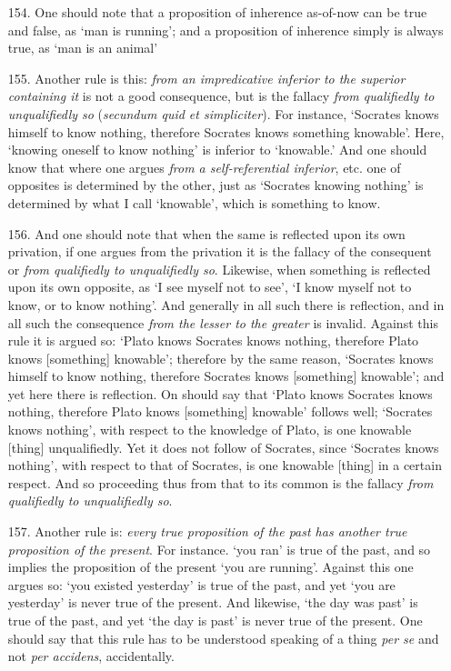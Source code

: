 \documentclass[]{article}
\begin{document}
\begin{itemize}
\item[154.] One should note that a proposition of inherence as-of-now can be true and false, as `man is running'; and a proposition of inherence simply is always true, as `man is an animal'
\item[155.] Another rule is this: \textit{from an impredicative inferior to the superior containing it} is not a good consequence, but is the fallacy \textit{from qualifiedly to unqualifiedly so} (\textit{secundum quid et simpliciter}). For instance, `Socrates knows himself to know nothing, therefore Socrates knows something knowable'. Here, `knowing oneself to know nothing' is inferior to `knowable.' And one should know that where one argues \textit{from a self-referential inferior}, etc. one of opposites is determined by the other, just as `Socrates knowing nothing' is determined by what I call `knowable', which is something to know.
\item[156.] And one should note that when the same is reflected upon its own privation, if one argues from the privation it is the fallacy of the consequent or \textit{from qualifiedly to unqualifiedly so}. Likewise, when something is reflected upon its own opposite, as `I see myself not to see', `I know myself not to know, or to know nothing'. And generally in all such there is reflection, and in all such the consequence \textit{from the lesser to the greater} is invalid. Against this rule it is argued so: `Plato knows Socrates knows nothing, therefore Plato knows [something] knowable'; therefore by the same reason, `Socrates  knows himself to know nothing, therefore Socrates knows [something] knowable'; and yet here there is reflection. On should say that `Plato knows Socrates knows nothing, therefore Plato knows [something] knowable' follows well; `Socrates knows nothing', with respect to the knowledge of Plato, is one knowable [thing] unqualifiedly. Yet it does not follow of Socrates, since `Socrates knows nothing', with respect to that of Socrates, is one knowable [thing] in a certain respect. And so proceeding thus from that to its common is the fallacy \textit{from qualifiedly to unqualifiedly so}. 
\item[157.] Another rule is: \textit{every true proposition of the past has another true proposition of the present}. For instance. `you ran' is true of the past, and so implies the proposition of the present `you are running'. Against this one argues so: `you existed yesterday' is true of the past, and yet `you are yesterday' is never true of the present. And likewise, `the day was past' is true of the past, and yet `the day is past' is never true of the present. One should say that this rule has to be understood speaking of a thing \textit{per se} and not \textit{per accidens}, accidentally. 

\end{itemize}
\end{document}

